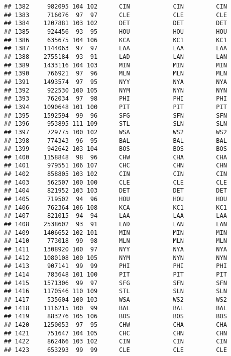 \documentclass[]{article}
\begin{document}
\begin{verbatim}
## 1382     982095 104 102      CIN            CIN         CIN
## 1383     716076  97  97      CLE            CLE         CLE
## 1384    1207881 103 102      DET            DET         DET
## 1385     924456  93  95      HOU            HOU         HOU
## 1386     635675 104 106      KCA            KC1         KC1
## 1387    1144063  97  97      LAA            LAA         LAA
## 1388    2755184  93  91      LAD            LAN         LAN
## 1389    1433116 104 103      MIN            MIN         MIN
## 1390     766921  97  96      MLN            MLN         MLN
## 1391    1493574  97  95      NYY            NYA         NYA
## 1392     922530 100 105      NYM            NYN         NYN
## 1393     762034  97  98      PHI            PHI         PHI
## 1394    1090648 101 100      PIT            PIT         PIT
## 1395    1592594  99  96      SFG            SFN         SFN
## 1396     953895 111 109      STL            SLN         SLN
## 1397     729775 100 102      WSA            WS2         WS2
## 1398     774343  96  95      BAL            BAL         BAL
## 1399     942642 103 104      BOS            BOS         BOS
## 1400    1158848  98  96      CHW            CHA         CHA
## 1401     979551 106 107      CHC            CHN         CHN
## 1402     858805 103 102      CIN            CIN         CIN
## 1403     562507 100 100      CLE            CLE         CLE
## 1404     821952 103 103      DET            DET         DET
## 1405     719502  94  96      HOU            HOU         HOU
## 1406     762364 106 108      KCA            KC1         KC1
## 1407     821015  94  94      LAA            LAA         LAA
## 1408    2538602  93  91      LAD            LAN         LAN
## 1409    1406652 102 101      MIN            MIN         MIN
## 1410     773018  99  98      MLN            MLN         MLN
## 1411    1308920 100  97      NYY            NYA         NYA
## 1412    1080108 100 105      NYM            NYN         NYN
## 1413     907141  99  99      PHI            PHI         PHI
## 1414     783648 101 100      PIT            PIT         PIT
## 1415    1571306  99  97      SFG            SFN         SFN
## 1416    1170546 110 109      STL            SLN         SLN
## 1417     535604 100 103      WSA            WS2         WS2
## 1418    1116215 100  99      BAL            BAL         BAL
## 1419     883276 105 106      BOS            BOS         BOS
## 1420    1250053  97  95      CHW            CHA         CHA
## 1421     751647 104 105      CHC            CHN         CHN
## 1422     862466 103 102      CIN            CIN         CIN
## 1423     653293  99  99      CLE            CLE         CLE

\end{verbatim}
\end{document}
